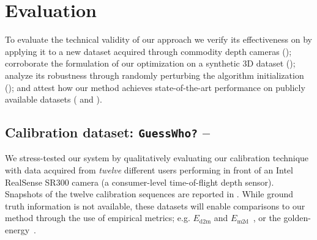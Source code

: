 \section{Evaluation}
To evaluate the technical validity of our approach we verify its effectiveness on by applying it to a new dataset acquired through commodity depth cameras (); corroborate the formulation of our optimization on a synthetic 3D dataset (); analyze its robustness through randomly perturbing the algorithm initialization (); and attest how our method achieves state-of-the-art performance on publicly available datasets ( and ).

\subsection{Calibration dataset: \texttt{GuessWho?} -- } 
\label{sec:evaldataset}
We stress-tested our system by qualitatively evaluating our calibration technique with data acquired from \emph{twelve} different users performing in front of an Intel RealSense SR300 camera (a consumer-level time-of-flight depth sensor). Snapshots of the twelve calibration sequences are reported in .
While ground truth information is not available, these datasets will enable comparisons to our method through the use of empirical metrics; e.g. $E_\text{d2m}$ and $E_\text{m2d}$~\cite{tkach2016sphere}, or the golden-energy~\cite{taylor2016joint}.

